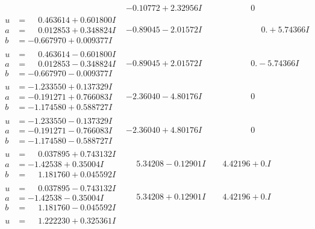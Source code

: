 \documentclass[1p]{elsarticle_modified}
\theoremstyle{definition}
\begin{document}
$$\begin{array}{c|c|c}
 & -0.10772 + 2.32956 I & \phantom{-0.000000 } 0 \\ \hline\begin{aligned}
u &= \phantom{-}0.463614 + 0.601800 I \\
a &= \phantom{-}0.012853 + 0.348824 I \\
b &= -0.667970 + 0.009377 I\end{aligned}
 & -0.89045 - 2.01572 I & \phantom{-0.000000 -}0. + 5.74366 I \\ \hline\begin{aligned}
u &= \phantom{-}0.463614 - 0.601800 I \\
a &= \phantom{-}0.012853 - 0.348824 I \\
b &= -0.667970 - 0.009377 I\end{aligned}
 & -0.89045 + 2.01572 I & \phantom{-0.000000 } 0. - 5.74366 I \\ \hline\begin{aligned}
u &= -1.233550 + 0.137329 I \\
a &= -0.191271 + 0.766083 I \\
b &= -1.174580 + 0.588727 I\end{aligned}
 & -2.36040 - 4.80176 I & \phantom{-0.000000 } 0 \\ \hline\begin{aligned}
u &= -1.233550 - 0.137329 I \\
a &= -0.191271 - 0.766083 I \\
b &= -1.174580 - 0.588727 I\end{aligned}
 & -2.36040 + 4.80176 I & \phantom{-0.000000 } 0 \\ \hline\begin{aligned}
u &= \phantom{-}0.037895 + 0.743132 I \\
a &= -1.42538 + 0.35004 I \\
b &= \phantom{-}1.181760 + 0.045592 I\end{aligned}
 & \phantom{-}5.34208 - 0.12901 I & \phantom{-}4.42196 + 0. I\phantom{ +0.000000I} \\ \hline\begin{aligned}
u &= \phantom{-}0.037895 - 0.743132 I \\
a &= -1.42538 - 0.35004 I \\
b &= \phantom{-}1.181760 - 0.045592 I\end{aligned}
 & \phantom{-}5.34208 + 0.12901 I & \phantom{-}4.42196 + 0. I\phantom{ +0.000000I} \\ \hline\begin{aligned}
u &= \phantom{-}1.222230 + 0.325361 I \\

\end{aligned}
\end{array}$$
\end{document}
